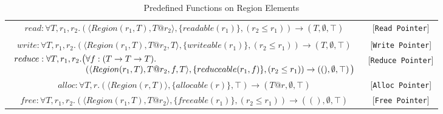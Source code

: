 \documentclass{article}
\newcommand{\rtriple}[3]{\left({#1},{#2},{#3}\right)}
\newcommand{\rsingle}[1]{\rtriple{#1}{\emptyset}{\top}}
\begin{document}
\begin{table*}
\centering
{\small
\begin{tabular}{cc}
%
% 
\begin{math}
\begin{array}{l}
read : \forall T,r_1,r_2. \rtriple{\langle Region(r_1,T), T@r_2 \rangle}{\{ readable(r_1) \}}{(r_2 \le r_1)} \rightarrow \rsingle{T}
\end{array}
\end{math} & [{\tt Read Pointer}] \\

%
%
\begin{math}
write : \forall T,r_1,r_2. \rtriple{\langle Region(r_1,T), T@r_2, T \rangle}{\{ writeable(r_1) \}}{(r_2 \le r_1)} \rightarrow \rsingle{T}
\end{math} & [{\tt Write Pointer}] \\

%
%
\begin{math}
\begin{array}{l@{}l}
reduce : \forall T,r_1,r_2. \big( & \forall f:(T \rightarrow T \rightarrow T). \\
& \rtriple{\langle Region(r_1,T), T@r_2, f, T \rangle}{\{ reduceable(r_1,f) \}}{(r_2 \le r_1)} \rightarrow \rsingle{()} \big) \end{array}
\end{math} & [{\tt Reduce Pointer}] \\

%
%
\begin{math}
alloc : \forall T,r. \rtriple{\langle Region(r,T) \rangle}{\{ allocable(r) \}}{\top} \rightarrow \rsingle{T@r}
\end{math} & [{\tt Alloc Pointer}] \\

%
%
\begin{math}
free : \forall T,r_1,r_2. \rtriple{\langle Region(r_1,T), T@r_2 \rangle}{\{ freeable(r_1) \}}{(r_2 \le r_1)} \rightarrow \rsingle{()}
\end{math} & [{\tt Free Pointer}]
\end{tabular}
}
\caption{Predefined Functions on Region Elements}
\end{table*}
\end{document}
